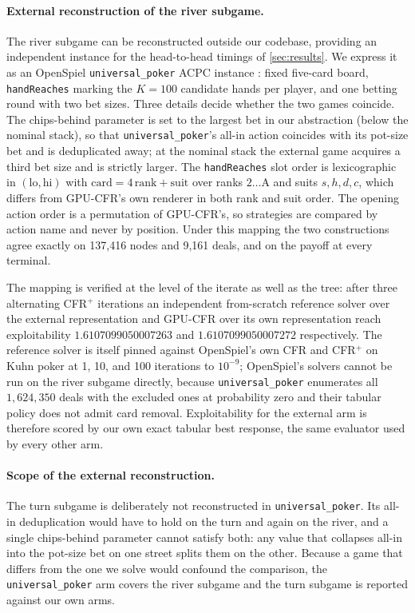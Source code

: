 \paragraph{External reconstruction of the river subgame.}
The river subgame can be reconstructed outside our codebase, providing an independent
instance for the
head-to-head timings of \cref{sec:results}. We express it as an OpenSpiel
\texttt{universal\_poker} ACPC instance \cite{lanctot2019openspiel}: fixed five-card
board, \texttt{handReaches} marking the $K{=}100$ candidate hands per player, and one
betting round with two bet sizes. Three details decide whether the two games coincide.
The chips-behind parameter is set to the largest bet in our abstraction (below the
nominal stack), so that \texttt{universal\_poker}'s all-in action coincides with its
pot-size bet and is deduplicated away; at the nominal stack the external game acquires a
third bet size and is strictly larger. The \texttt{handReaches} slot order is
lexicographic in $(\mathrm{lo}, \mathrm{hi})$ with $\mathrm{card} = 4\,\mathrm{rank} +
\mathrm{suit}$ over ranks $2{\ldots}\mathrm{A}$ and suits $s, h, d, c$, which differs
from GPU-CFR's own renderer in both rank and suit order. The opening action order is a
permutation of GPU-CFR's, so strategies are compared by action name and never by position.
Under this mapping the two constructions agree exactly on 137{,}416 nodes and 9{,}161
deals, and on the payoff at every terminal.

The mapping is verified at the level of the iterate as well as the tree: after three
alternating CFR$^+$ iterations an independent from-scratch reference solver over the
external representation and GPU-CFR over its own representation reach exploitability
$1.6107099050007263$ and $1.6107099050007272$ respectively. The reference solver is itself pinned
against OpenSpiel's own CFR and CFR$^+$ on Kuhn poker at 1, 10, and 100 iterations to
$10^{-9}$; OpenSpiel's solvers cannot be run on the river subgame directly, because
\texttt{universal\_poker} enumerates all $1{,}624{,}350$ deals with the excluded ones at
probability zero and their tabular policy does not admit card removal. Exploitability
for the external arm is therefore scored by our own exact tabular best response, the
same evaluator used by every other arm.

\paragraph{Scope of the external reconstruction.}
The turn subgame is deliberately not reconstructed in \texttt{universal\_poker}. Its
all-in deduplication would have to hold on the turn and again on the river, and a
single chips-behind parameter cannot satisfy both: any value that collapses all-in
into the pot-size bet on one street splits them on the other. Because a game that differs from the one we solve would confound the comparison,
the \texttt{universal\_poker} arm
covers the river subgame and the turn subgame is reported against our own arms.

